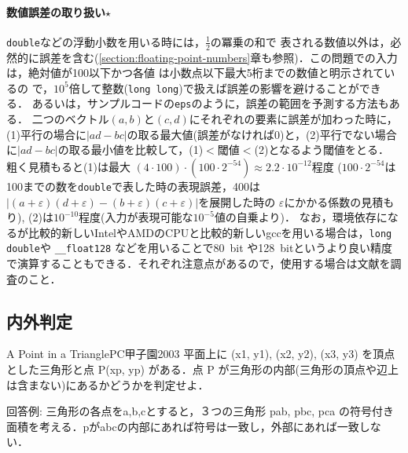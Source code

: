 \paragraph{数値誤差の取り扱い$\star$}
\texttt{double}などの浮動小数を用いる時には，$\frac{1}{2}$の冪乗の和で
表される数値以外は，必然的に誤差を含む(\ref{section:floating-point-numbers}章も参照)．この問題での入力は，絶対値が100以下かつ各値
は小数点以下最大5桁までの数値と明示されているの
で，$10^5$倍して整数(\texttt{long long})で扱えば誤差の影響を避けることができる．
あるいは，サンプルコードの\texttt{eps}のように，誤差の範囲を予測する方法もある．
二つのベクトル$(a,b)$と$(c,d)$にそれぞれの要素に誤差が加わった時に，
(1)平行の場合に$|ad-bc|$の取る最大値(誤差がなければ$0$)と，(2)平行でない場合に$|ad-bc|$の取る最小値を比較して，(1)$<$閾値$<$(2)となるよう閾値をとる．
粗く見積もると(1)は最大
$(4\cdot100)\cdot(100\cdot2^{-54})\approx2.2\cdot10^{-12}$程度
($100\cdot2^{-54}$は100までの数を\texttt{double}で表した時の表現誤差，400は
$|(a+\varepsilon)(d+\varepsilon)-(b+\varepsilon)(c+\varepsilon)|$を展開した時の
$\varepsilon$にかかる係数の見積もり), 
(2)は$10^{-10}$程度(入力が表現可能な$10^{-5}$値の自乗より)．
なお，環境依存になるが比較的新しいIntelやAMDのCPUと比較的新しいgccを用いる場合は，\texttt{long double}や
\texttt{\_\_float128} などを用いることで80~bit や128~bitというより良い精度で演算することもできる．それぞれ注意点があるので，使用する場合は文献を調査のこと．

\subsection{内外判定}

\begin{psbox}{A Point in a Triangle}{PC甲子園2003}
平面上に (x1, y1), (x2, y2), (x3, y3) を頂点とした三角形と点 P(xp, yp) がある．点 P が三角形の内部(三角形の頂点や辺上は含まない)にあるかどうかを判定せよ．

\end{psbox}
    
回答例: 三角形の各点をa,b,cとすると，３つの三角形 pab, pbc, pca の符号付き面積を考える．pがabcの内部にあれば符号は一致し，外部にあれば一致しない．

